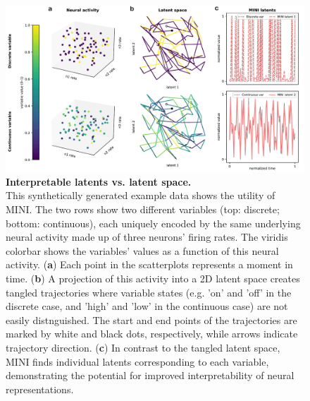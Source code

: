 \begin{figure}[h]
    \centering
    \includegraphics[width=\linewidth]{figures/interpretable_latents_vs_latent_space.pdf}
    \caption{
        \textbf{Interpretable latents vs. latent space.} \\
        \small This synthetically generated example data shows the utility of MINI. The two rows show two different variables (top: discrete; bottom: continuous), each uniquely encoded by the same underlying neural activity made up of three neurons' firing rates. The viridis colorbar shows the variables' values as a function of this neural activity. (\textbf{a}) Each point in the scatterplots represents a moment in time. (\textbf{b}) A projection of this activity into a 2D latent space creates tangled trajectories where variable states (e.g. 'on' and 'off' in the discrete case, and 'high' and 'low' in the continuous case) are not easily distnguished. The start and end points of the trajectories are marked by white and black dots, respectively, while arrows indicate trajectory direction. (\textbf{c}) In contrast to the tangled latent space, MINI finds individual latents corresponding to each variable, demonstrating the potential for improved interpretability of neural representations.
    }
    \label{fig:interpretable_latents_vs_latent_space}
\end{figure}